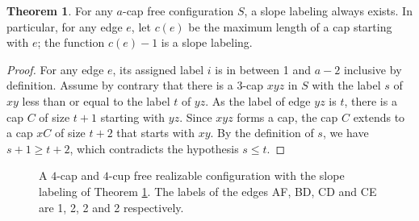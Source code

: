 \documentclass{amsart}
\theoremstyle{definition}
\newtheorem{theorem}[thm]{Theorem}
\numberwithin{thm}{section}
\begin{document}
\begin{theorem}
\label{thm:label}
For any $a$-cap free configuration $S$, a slope labeling always exists.
In particular, for any edge $e$, let $c(e)$ be the maximum length of a cap starting with $e$; the function $c(e)-1$ is a slope labeling.
\end{theorem}
\begin{proof}
For any edge $e$, its assigned label $i$ is in between 1 and $a-2$ inclusive by definition.
Assume by contrary that there is a 3-cap $xyz$ in $S$
with the label $s$ of $xy$ less than or equal to the label $t$ of $yz$.
As the label of edge $yz$ is $t$, there is a cap $C$ of size $t + 1$ starting with $yz$.
Since $xyz$ forms a cap, the cap $C$ extends to a cap $xC$ of size $t + 2$ that starts with $xy$.
By the definition of $s$, we have $s + 1 \geq t + 2$, which contradicts the hypothesis $s \leq t$.
\end{proof}

\begin{center}
\begin{figure}[h]
\centering 
{}
\caption{
A $4$-cap and $4$-cup free realizable configuration with the slope labeling of Theorem \ref{thm:label}. 
The labels of the edges AF, BD, CD and CE are 1, 2, 2 and 2 respectively.
}
\label{fig:example}
\end{figure}
\end{center}
\end{document}
